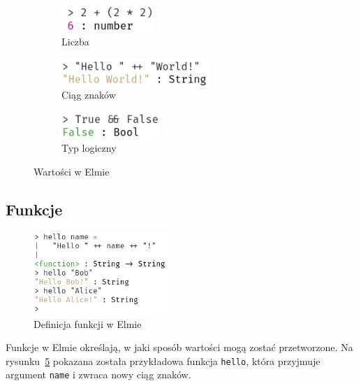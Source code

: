 \documentclass[twoside,a4paper]{report}
\begin{document}
\begin{figure}[H]
    \centering
    \begin{subfigure}{.29\textwidth}
        \centering
        \includegraphics[height=1cm]{img/repl_number}
        \caption{Liczba}\label{fig:repl_number}
    \end{subfigure}
    \begin{subfigure}{.4\textwidth}
        \centering
        \includegraphics[height=1cm]{img/repl_string}
        \caption{Ciąg znaków}\label{fig:repl_string}
    \end{subfigure}
    \begin{subfigure}{.29\textwidth}
        \centering
        \includegraphics[height=1cm]{img/repl_bool}
        \caption{Typ logiczny}\label{fig:repl_bool}
    \end{subfigure}
    \caption{Wartości w Elmie}\label{fig:repl_values}
\end{figure}

\subsection{Funkcje}
\begin{figure}
    \centering
    \includegraphics[width=0.45\textwidth]{img/repl_func}
    \caption{Definicja funkcji w Elmie}\label{fig:repl_func}
\end{figure}

Funkcje w Elmie określają, w jaki sposób wartości mogą zostać przetworzone.
Na rysunku~\ref{fig:repl_func} pokazana została przykładowa funkcja \texttt{hello}, która przyjmuje argument \texttt{name} i zwraca nowy ciąg znaków.
\end{document}
